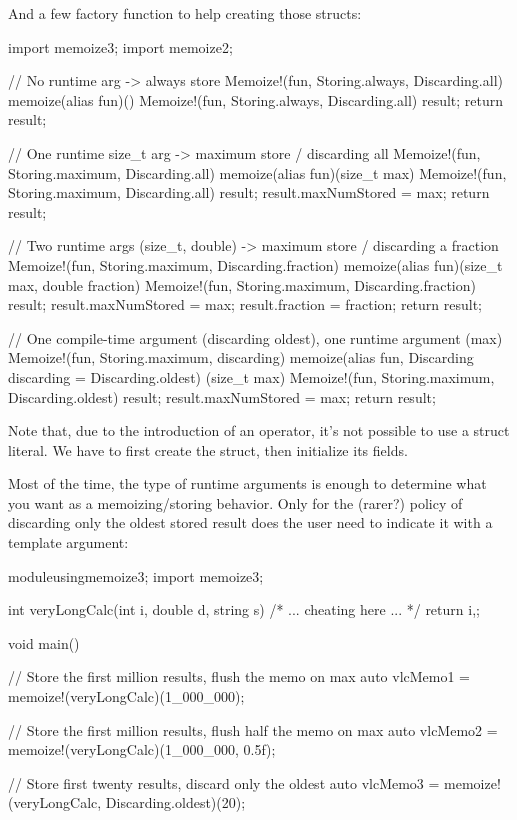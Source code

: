 And a few factory function to help creating those  structs:

\begin{dcode}
import memoize3;
import memoize2;

// No runtime arg -> always store
Memoize!(fun, Storing.always, Discarding.all)
memoize(alias fun)()
{
    Memoize!(fun, 
             Storing.always, 
             Discarding.all) result;
    return result;
}

// One runtime size_t arg -> maximum store / discarding all
Memoize!(fun, Storing.maximum, Discarding.all)
memoize(alias fun)(size_t max)
{
    Memoize!(fun, 
             Storing.maximum, 
             Discarding.all) result;
    result.maxNumStored = max;
    return result;
}

// Two runtime args (size_t, double) -> maximum store / discarding a fraction
Memoize!(fun, Storing.maximum, Discarding.fraction)
memoize(alias fun)(size_t max, double fraction)
{
    Memoize!(fun, 
             Storing.maximum, 
             Discarding.fraction) result;
    result.maxNumStored = max;
    result.fraction = fraction;
    return result;
}

// One compile-time argument (discarding oldest), one runtime argument (max)
Memoize!(fun, Storing.maximum, discarding)
memoize(alias fun, Discarding discarding = Discarding.oldest)
(size_t max)
{
    Memoize!(fun, 
             Storing.maximum, 
             Discarding.oldest) result;
    result.maxNumStored = max;
    return result;
}
\end{dcode}

Note that, due to the introduction of an  operator, it's not possible to use a struct literal. We have to first create the struct, then initialize its fields.

Most of the time, the type of runtime arguments is enough to determine what you want as a memoizing/storing behavior. Only for the (rarer?) policy of discarding only the oldest stored result does the user need to indicate it with a template argument:

\begin{dcode}
moduleusingmemoize3;
import memoize3;

int veryLongCalc(int i, double d, string s)
{
   /* ... cheating here ... */
   return i,;
}

void main()
{
    // Store the first million results, flush the memo on max
    auto vlcMemo1 = memoize!(veryLongCalc)(1_000_000);

    // Store the first million results, flush half the memo on max
    auto vlcMemo2 = memoize!(veryLongCalc)(1_000_000, 0.5f);

    // Store first twenty results, discard only the oldest  
    auto vlcMemo3 = memoize!(veryLongCalc, Discarding.oldest)(20);
}
\end{dcode}

